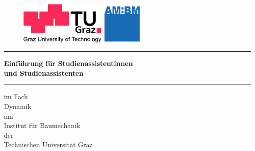 %
%
\begin{titlepage}
        \begin{figure}[htbp]
        \hspace{.05\linewidth}
            \begin{minipage}[b]{.6\linewidth}
                \includegraphics[width=4.2cm]{coverPics/logo_lang_V8.pdf}
            \end{minipage}
            \hspace{.2\linewidth}
        \begin{minipage}[b]{.2\linewidth}
                \includegraphics[width=2cm]{coverPics/AM_BM.pdf}
        \end{minipage}
        \end{figure}

        \vspace*{3mm}
    \hrule

    \fontsize{16pt}{24pt}\selectfont


\begin{center}
    \vspace{30mm}
        \textsf{\textbf{Einf\"{u}hrung f\"{u}r Studienassistentinnen \\
          und Studienassistenten}}\\
    \normalfont

    \vspace{10mm}
        \hrule
    \vspace{10mm}
    \normalsize{im Fach}\\
    \vspace{5mm}
    \huge{Dynamik}\\
    \vspace{5mm}
    \normalsize{am}\\
    \vspace{5mm}
    \Large{Institut f\"{u}r Baumechanik \\ der 
          \\ Technischen Universit\"{a}t Graz} \\


\end{center}
\end{titlepage}
